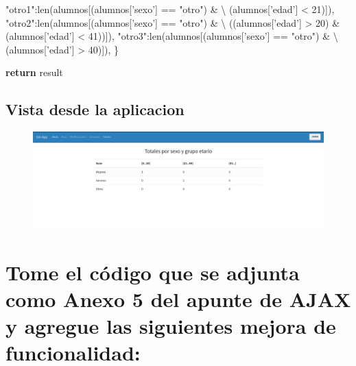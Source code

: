 \documentclass[12pt]{extarticle}
\newenvironment{Shaded}{}{}
\newcommand{\DecValTok}[1]{\textcolor[rgb]{0.25,0.63,0.44}{{#1}}}
\newcommand{\StringTok}[1]{\textcolor[rgb]{0.25,0.44,0.63}{{#1}}}
\newcommand{\NormalTok}[1]{{#1}}
\newcommand{\ControlFlowTok}[1]{\textcolor[rgb]{0.00,0.44,0.13}{\textbf{{#1}}}}
\newcommand{\OperatorTok}[1]{\textcolor[rgb]{0.40,0.40,0.40}{{#1}}}
\newcommand{\BuiltInTok}[1]{{#1}}
\begin{document}
\begin{Shaded}
\begin{Highlighting}[]
        \StringTok{"otro1"}\NormalTok{:}\BuiltInTok{len}\NormalTok{(alumnos[(alumnos[}\StringTok{'sexo'}\NormalTok{] }\OperatorTok{==} \StringTok{"otro"}\NormalTok{) }\OperatorTok{&} \OperatorTok{\textbackslash{}}
\NormalTok{                            (alumnos[}\StringTok{'edad'}\NormalTok{] }\OperatorTok{<} \DecValTok{21}\NormalTok{)]),}
        \StringTok{"otro2"}\NormalTok{:}\BuiltInTok{len}\NormalTok{(alumnos[(alumnos[}\StringTok{'sexo'}\NormalTok{] }\OperatorTok{==} \StringTok{"otro"}\NormalTok{) }\OperatorTok{&} \OperatorTok{\textbackslash{}}
\NormalTok{                            ((alumnos[}\StringTok{'edad'}\NormalTok{] }\OperatorTok{>} \DecValTok{20}\NormalTok{) }\OperatorTok{&}\NormalTok{ (alumnos[}\StringTok{'edad'}\NormalTok{] }\OperatorTok{<} \DecValTok{41}\NormalTok{))]),}
        \StringTok{"otro3"}\NormalTok{:}\BuiltInTok{len}\NormalTok{(alumnos[(alumnos[}\StringTok{'sexo'}\NormalTok{] }\OperatorTok{==} \StringTok{"otro"}\NormalTok{) }\OperatorTok{&} \OperatorTok{\textbackslash{}}
\NormalTok{                            (alumnos[}\StringTok{'edad'}\NormalTok{] }\OperatorTok{>} \DecValTok{40}\NormalTok{)]),}
\NormalTok{    \}}

    \ControlFlowTok{return}\NormalTok{ result}
\end{Highlighting}
\end{Shaded}

\subsection{Vista desde la aplicacion}\label{vista-desde-la-aplicacion}

\begin{figure}[h]
\centering
\includegraphics{images/totales.png}
\caption{}
\end{figure}

    \section{Tome el código que se adjunta como Anexo 5 del apunte de AJAX y
agregue las siguientes mejora de
funcionalidad:}\label{tome-el-cuxf3digo-que-se-adjunta-como-anexo-5-del-apunte-de-ajax-y-agregue-las-siguientes-mejora-de-funcionalidad}
\end{document}
